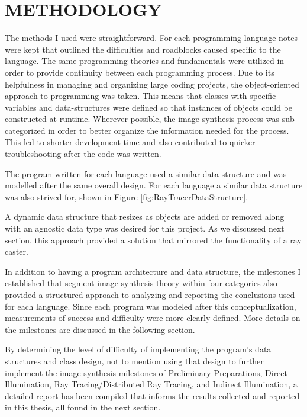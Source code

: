 %
%
%


\chapter{\uppercase {Methodology}}
The methods I used were straightforward.  For each programming language notes were kept that outlined the difficulties and roadblocks caused specific to the language.  The same programming theories and fundamentals were utilized in order to provide continuity between each programming process.  Due to its helpfulness in managing and organizing large coding projects, the object-oriented approach to programming was taken.  This means that classes with specific variables and data-structures were defined so that instances of objects could be constructed at runtime.  Wherever possible, the image synthesis process was sub-categorized in order to better organize the information needed for the process. This led to shorter development time and also contributed to quicker troubleshooting after the code was written.

The program written for each language used a similar data structure and was modelled after the same overall design.  For each language a similar data structure was also strived for, shown in Figure \ref{fig:RayTracerDataStructure}.

A dynamic data structure that resizes as objects are added or removed along with an agnostic data type was desired for this project.  As we discussed next section, this approach provided a solution that mirrored the functionality of a ray caster.

In addition to having a program architecture and data structure, the milestones I established that segment image synthesis theory within four categories also provided a structured approach to analyzing and reporting the conclusions used for each language. Since each program was modeled after this conceptualization, measurements of success and difficulty were more clearly defined. More details on the milestones are discussed in the following section.

By determining the level of difficulty of implementing the program's data structures and class design, not to mention using that design to further implement the image synthesis milestones of Preliminary Preparations, Direct Illumination, Ray Tracing/Distributed Ray Tracing, and Indirect Illumination, a detailed report has been compiled that informs the results collected and reported in this thesis, all found in the next section.